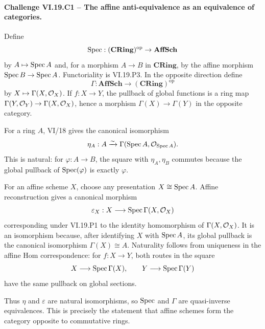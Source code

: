 
\paragraph{Challenge VI.19.C1 -- The affine anti-equivalence as an equivalence of categories.}
\begin{solution}
Define
\[
\operatorname{Spec}:(\mathbf{CRing})^{\mathrm{op}}\to\mathbf{AffSch}
\]
by \(A\mapsto\operatorname{Spec} A\) and, for a morphism \(A\to B\) in \(\mathbf{CRing}\), by the affine morphism \(\operatorname{Spec} B\to\operatorname{Spec} A\).  Functoriality is VI.19.P3.  In the opposite direction define
\[
\Gamma:\mathbf{AffSch}\to(\mathbf{CRing})^{\mathrm{op}}
\]
by \(X\mapsto\Gamma(X,\mathcal O_X)\).  If \(f:X\to Y\), the pullback of global functions is a ring map \(\Gamma(Y,\mathcal O_Y)\to\Gamma(X,\mathcal O_X)\), hence a morphism \(\Gamma(X)\to\Gamma(Y)\) in the opposite category.

For a ring \(A\), VI/18 gives the canonical isomorphism
\[
\eta_A:A\xrightarrow{\sim}\Gamma(\operatorname{Spec} A,\mathcal O_{\operatorname{Spec} A}).
\]
This is natural: for \(\varphi:A\to B\), the square with \(\eta_A,\eta_B\) commutes because the global pullback of \(\operatorname{Spec}(\varphi)\) is exactly \(\varphi\).

For an affine scheme \(X\), choose any presentation \(X\cong\operatorname{Spec} A\).  Affine reconstruction gives a canonical morphism
\[
\varepsilon_X:X\longrightarrow\operatorname{Spec}\Gamma(X,\mathcal O_X)
\]
corresponding under VI.19.P1 to the identity homomorphism of \(\Gamma(X,\mathcal O_X)\).  It is an isomorphism because, after identifying \(X\) with \(\operatorname{Spec} A\), its global pullback is the canonical isomorphism \(\Gamma(X)\cong A\).  Naturality follows from uniqueness in the affine Hom correspondence: for \(f:X\to Y\), both routes in the square
\[
X\longrightarrow\operatorname{Spec}\Gamma(X),\qquad
Y\longrightarrow\operatorname{Spec}\Gamma(Y)
\]
have the same pullback on global sections.

Thus \(\eta\) and \(\varepsilon\) are natural isomorphisms, so \(\operatorname{Spec}\) and \(\Gamma\) are quasi-inverse equivalences.  This is precisely the statement that affine schemes form the category opposite to commutative rings.
\end{solution}

